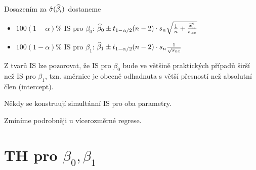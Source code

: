Dosazením za $\hat{\sigma}(\widehat{\beta}_i)$ dostaneme

\begin{itemize}
	\item $100(1-\alpha)\%$ IS pro $\beta_0$: $\widehat{\beta}_0 \pm t_{1-\alpha/2}(n-2) \cdot s_n \sqrt{\frac{1}{n} + \frac{\overline{x}_n^2}{s_{xx}}}$
	\item $100(1-\alpha)\%$ IS pro $\beta_1$: $\widehat{\beta}_1 \pm t_{1-\alpha/2}(n-2) \cdot s_n \frac{1}{\sqrt{s_{xx}}}$
\end{itemize}

\begin{remark}
	Z tvarů IS lze pozorovat, že IS pro $\beta_0$ bude ve většině praktických případů širší než IS pro $\beta_1$, tzn. směrnice je obecně odhadnuta s větší přesností než absolutní člen (intercept).
\end{remark}


\begin{remark}
	Někdy se konstruují simultánní IS pro oba parametry. 

\begin{center}
    
\end{center}	
	
	 Zmíníme podrobněji u vícerozměrné regrese.
\end{remark}


\section{TH pro $\beta_0, \beta_1$}

